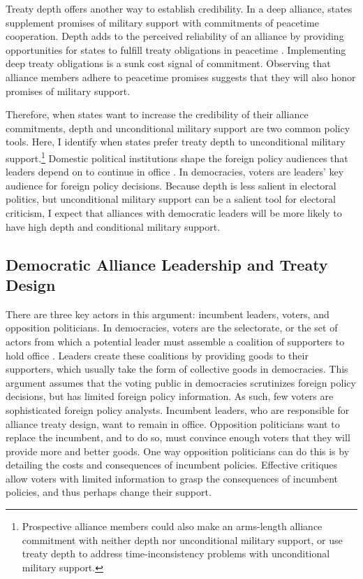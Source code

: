\documentclass[12pt]{article}
\begin{document}
Treaty depth offers another way to establish credibility.
In a deep alliance, states supplement promises of military support with commitments of peacetime cooperation.  
Depth adds to the perceived reliability of an alliance by providing opportunities for states to fulfill treaty obligations in peacetime \citep{Morrow1994}. 
Implementing deep treaty obligations is a sunk cost signal of commitment.
Observing that alliance members adhere to peacetime promises suggests that they will also honor promises of military support. 


Therefore, when states want to increase the credibility of their alliance commitments, depth and unconditional military support are two common policy tools. 
Here, I identify when states prefer treaty depth to unconditional military support.\footnote{Prospective alliance members could also make an arms-length alliance commitment with neither depth nor unconditional military support, or use treaty depth to address time-inconsistency problems with unconditional military support.}
Domestic political institutions shape the foreign policy audiences that leaders depend on to continue in office \citep{Weeks2008}. 
In democracies, voters are leaders' key audience for foreign policy decisions.  
Because depth is less salient in electoral politics, but unconditional military support can be a salient tool for electoral criticism, I expect that alliances with democratic leaders will be more likely to have high depth and conditional military support. 



\subsection{Democratic Alliance Leadership and Treaty Design}


There are three key actors in this argument: incumbent leaders, voters, and opposition politicians. 
In democracies, voters are the selectorate, or the set of actors from which a potential leader must assemble a coalition of supporters to hold office \citep{BDMetal2002}. 
Leaders create these coalitions by providing goods to their supporters, which usually take the form of collective goods in democracies. 
This argument assumes that the voting public in democracies scrutinizes foreign policy decisions, but has limited foreign policy information. 
As such, few voters are sophisticated foreign policy analysts. 
Incumbent leaders, who are responsible for alliance treaty design, want to remain in office.
Opposition politicians want to replace the incumbent, and to do so, must convince enough voters that they will provide more and better goods. 
One way opposition politicians can do this is by detailing the costs and consequences of incumbent policies.
Effective critiques allow voters with limited information to grasp the consequences of incumbent policies, and thus perhaps change their support. 
\end{document}
